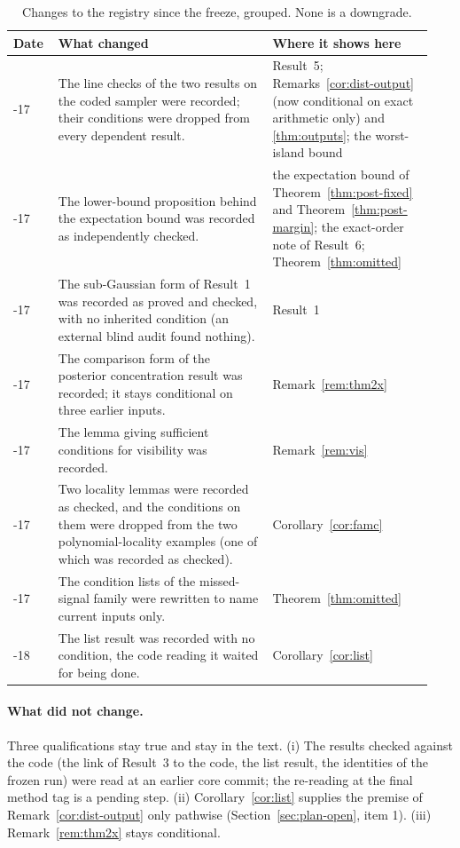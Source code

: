 \begin{table}[ht]
\centering\small
\caption{Changes to the registry since the freeze, grouped. None is a downgrade.}\label{tab:status-diff}
\begin{tabular}{@{}>{\raggedright\arraybackslash}p{0.1\linewidth}>{\raggedright\arraybackslash}p{0.48\linewidth}>{\raggedright\arraybackslash}p{0.36\linewidth}@{}}
\toprule
Date & What changed & Where it shows here \\
\midrule
11-17 & The line checks of the two results on the coded sampler were recorded; their conditions were dropped from every
dependent result. & Result~5; Remarks~\ref{cor:dist-output} (now conditional on exact arithmetic only) and
\ref{thm:outputs}; the worst-island bound \\
11-17 & The lower-bound proposition behind the expectation bound was recorded as independently checked. &
the expectation bound of Theorem~\ref{thm:post-fixed} and Theorem~\ref{thm:post-margin}; the exact-order note of Result~6;
Theorem~\ref{thm:omitted} \\
11-17 & The sub-Gaussian form of Result~1 was recorded as proved and checked, with no inherited condition (an external
blind audit found nothing). & Result~1 \\
11-17 & The comparison form of the posterior concentration result was recorded; it stays conditional on three earlier
inputs. & Remark~\ref{rem:thm2x} \\
11-17 & The lemma giving sufficient conditions for visibility was recorded. & Remark~\ref{rem:vis} \\
11-17 & Two locality lemmas were recorded as checked, and the conditions on them were dropped from the two
polynomial-locality examples (one of which was recorded as checked). & Corollary~\ref{cor:famc} \\
11-17 & The condition lists of the missed-signal family were rewritten to name current inputs only. &
Theorem~\ref{thm:omitted} \\
11-18 & The list result was recorded with no condition, the code reading it waited for being done. &
Corollary~\ref{cor:list} \\
\bottomrule
\end{tabular}
\end{table}

\paragraph{What did not change.} Three qualifications stay true and stay in the text. (i) The results checked against the
code (the link of Result~3 to the code, the list result, the identities of the frozen run) were read at an earlier core
commit; the
re-reading at the final method tag is a pending step. (ii) Corollary~\ref{cor:list} supplies the premise of Remark~\ref{cor:dist-output} only pathwise
(Section~\ref{sec:plan-open}, item 1). (iii) Remark~\ref{rem:thm2x} stays conditional.

